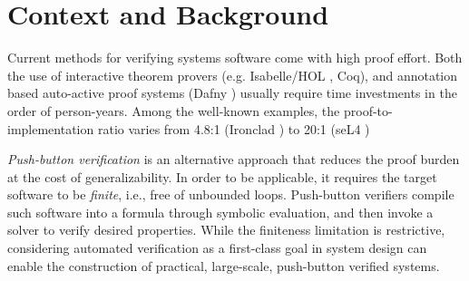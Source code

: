 \documentclass[11pt,a4paper,runningheads]{llncs}
\newcommand{\amd}{\textsf{x86\_32}\xspace}
\newcommand{\riscv}{\textsf{RISC-V}\xspace}
\newcommand{\llvm}{\textsf{LLVM}\xspace}
\newcommand{\bpf}{\textsf{BPF}\xspace}
\newcommand{\serval}{Serval\xspace}
\begin{document}


\section{Context and Background}
\label{context}

Current methods for verifying systems software come with high proof effort. Both
the use of interactive theorem provers (e.g. Isabelle/HOL \cite{isabelle}, Coq), and annotation
based auto-active proof systems (Dafny \cite{dafny}) usually require time investments in the
order of person-years. Among the well-known examples, the
proof-to-implementation ratio varies from 4.8:1 (Ironclad \cite{ironclad}) to 20:1 (seL4 \cite{sel4})

\textit{Push-button verification} is an alternative approach that reduces the proof
burden at the cost of generalizability. 
In order to be applicable, it requires the target software to be
\textit{finite}, i.e., free of unbounded loops. 
Push-button verifiers compile such software into a formula through symbolic
evaluation, and then invoke a solver to verify desired properties. 
While the finiteness limitation is restrictive, considering automated verification as a
first-class goal in system design can enable the construction of practical,
large-scale, push-button verified systems.

\end{document}
